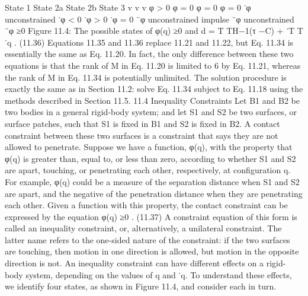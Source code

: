 State 1 State 2a State 2b State 3 v v v φ > 0 φ = 0 φ = 0 φ = 0 ˙φ unconstrained ˙φ < 0 ˙φ > 0 ˙φ = 0 ¨φ unconstrained impulse ¨φ unconstrained ¨φ ≥0 Figure 11.4: The possible states of φ(q) ≥0 and d = T TH−1(τ −C) + ˙T T ˙q . (11.36) Equations 11.35 and 11.36 replace 11.21 and 11.22, but Eq. 11.34 is essentially the same as Eq. 11.20. In fact, the only difference between these two equations is that the rank of M in Eq. 11.20 is limited to 6 by Eq. 11.21, whereas the rank of M in Eq. 11.34 is potentially unlimited. The solution procedure is exactly the same as in Section 11.2: solve Eq. 11.34 subject to Eq. 11.18 using the methods described in Section 11.5. 11.4 Inequality Constraints Let B1 and B2 be two bodies in a general rigid-body system; and let S1 and S2 be two surfaces, or surface patches, such that S1 is fixed in B1 and S2 is fixed in B2. A contact constraint between these two surfaces is a constraint that says they are not allowed to penetrate. Suppose we have a function, φ(q), with the property that φ(q) is greater than, equal to, or less than zero, according to whether S1 and S2 are apart, touching, or penetrating each other, respectively, at configuration q. For example, φ(q) could be a measure of the separation distance when S1 and S2 are apart, and the negative of the penetration distance when they are penetrating each other. Given a function with this property, the contact constraint can be expressed by the equation φ(q) ≥0 . (11.37) A constraint equation of this form is called an inequality constraint, or, alternatively, a unilateral constraint. The latter name refers to the one-sided nature of the constraint: if the two surfaces are touching, then motion in one direction is allowed, but motion in the opposite direction is not. An inequality constraint can have different effects on a rigid-body system, depending on the values of q and ˙q. To understand these effects, we identify four states, as shown in Figure 11.4, and consider each in turn.

